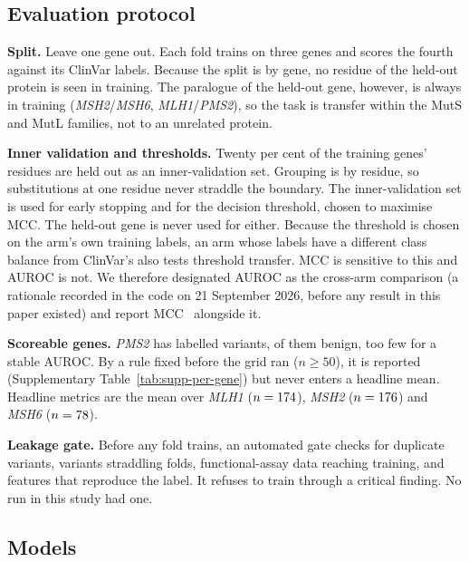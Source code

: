 \documentclass[11pt]{article}
\newcommand{\gene}[1]{\textit{#1}}
\begin{document}
\subsection{Evaluation protocol}

\textbf{Split.} Leave one gene out. Each fold trains on three genes and scores the fourth
against its ClinVar labels. Because the split is by gene, no residue of the held-out
protein is seen in training. The paralogue of the held-out gene, however, is always in
training (\gene{MSH2}/\gene{MSH6}, \gene{MLH1}/\gene{PMS2}), so the task is transfer
within the MutS and MutL families, not to an unrelated protein.

\textbf{Inner validation and thresholds.} Twenty per cent of the training genes' residues
are held out as an inner-validation set. Grouping is by residue, so substitutions at one
residue never straddle the boundary. The inner-validation set is used for early stopping
and for the decision threshold, chosen to maximise MCC. The held-out gene is never used
for either. Because the threshold is chosen on the arm's own training labels, an arm whose
labels have a different class balance from ClinVar's also tests threshold transfer. MCC
is sensitive to this and AUROC is not. We therefore designated AUROC as the cross-arm
comparison (a rationale recorded in the code on 21 September 2026, before any result in
this paper existed) and report MCC~\citep{chicco2020mcc} alongside it.

\textbf{Scoreable genes.} \gene{PMS2} has \nPMSTwo{} labelled variants, \benignPMSTwo{} of
them benign, too few for a stable AUROC. By a rule fixed before the grid ran
($n\geq50$), it is reported (Supplementary Table~\ref{tab:supp-per-gene}) but never enters
a headline mean. Headline metrics are the mean over \gene{MLH1} ($n=174$),
\gene{MSH2} ($n=176$) and \gene{MSH6} ($n=78$).

\textbf{Leakage gate.} Before any fold trains, an automated gate checks for duplicate
variants, variants straddling folds, functional-assay data reaching training, and
features that reproduce the label. It refuses to train through a critical finding. No
run in this study had one.

\subsection{Models}
\end{document}
